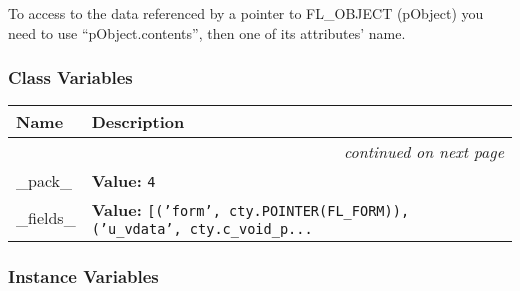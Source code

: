 To access to the data referenced by a pointer to FL\_OBJECT (pObject) you
need to use ``pObject.contents'', then one of its attributes' name.


  \subsubsection{Class Variables}

    \vspace{-1cm}
\hspace{\varindent}\begin{longtable}{|p{\varnamewidth}|p{\vardescrwidth}|l}
\cline{1-2}
\cline{1-2} \centering \textbf{Name} & \centering \textbf{Description}& \\
\cline{1-2}
\endhead\cline{1-2}\multicolumn{3}{r}{\small\textit{continued on next page}}\\\endfoot\cline{1-2}
\endlastfoot\raggedright \_\-p\-a\-c\-k\-\_\- & \raggedright \textbf{Value:} 
{\tt 4}&\\
\cline{1-2}
\raggedright \_\-f\-i\-e\-l\-d\-s\-\_\- & \raggedright \textbf{Value:} 
{\tt [('form', cty.POINTER(FL\_FORM)), ('u\_vdata', cty.c\_void\_p\texttt{...}}&\\
\cline{1-2}
\end{longtable}



  \subsubsection{Instance Variables}

